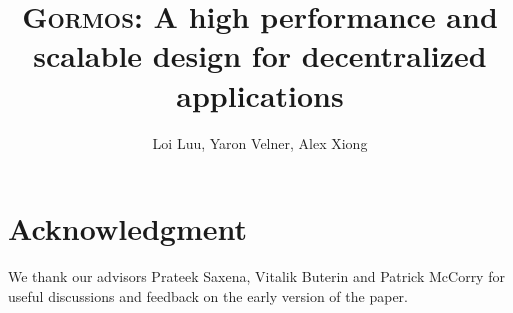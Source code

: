 \documentclass{styles/llncs}
\newcommand{\codename}{{\scshape Gormos}\xspace}
\begin{document}
\title{
  \codename: A high performance and scalable design for decentralized applications
}
\author{
    Loi Luu, Yaron Velner, Alex Xiong\\
}

{\def\addcontentsline#1#2#3{}\maketitle}


\setcounter{tocdepth}{2}
\tableofcontents
\newpage



\section{Acknowledgment}
We thank our advisors Prateek Saxena, Vitalik Buterin and Patrick McCorry for useful discussions and feedback on the early version of
the paper.





% 
\end{document}
